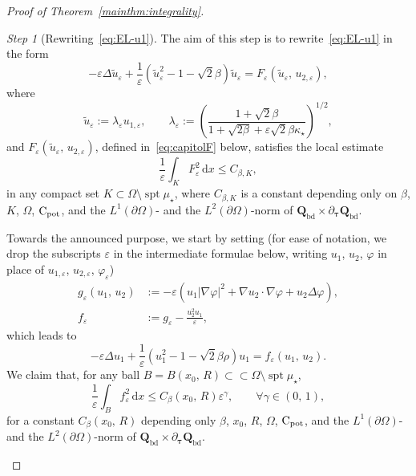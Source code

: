 \documentclass[a4paper, 11pt, twoside, leqno]{article}
\theoremstyle{definition}              %
\theoremstyle{remark}                  %
\newtheorem{step}{Step}
\DeclareMathOperator{\spt}{spt}                                     %
\newcommand{\abs}[1]{\left| #1 \right|}                             %
\newcommand{\csubset}{\subset\!\subset}                             %
\renewcommand{\d}{\mathrm{d}}
\newcommand{\Q}{\mathbf{Q}}
\newcommand{\eps}{\varepsilon}
\newcommand{\Cpot}{{\rm C}_{\rm pot}}
\newcommand{\ttau}{{\boldsymbol{\tau}}}
\newcommand{\Qb}{\Q_{\mathrm{bd}}}
\begin{document}
\begin{proof}[{Proof of Theorem~\ref{mainthm:integrality}}]
    \setcounter{step}{0}
    \begin{step}[Rewriting~\eqref{eq:EL-u1}]
	The aim of this step is to rewrite~\eqref{eq:EL-u1} in the form
    \begin{equation}\label{eq:EL-u1-bis}
    	-\eps \Delta \widetilde{u}_\eps + \frac{1}{\eps}\left( \widetilde{u}_\eps^2 - 1 - \sqrt{2}\beta \right)\widetilde{u}_\eps 
    	= F_\eps\left(\widetilde{u}_\eps,\,u_{2,\eps}\right),
    \end{equation}
    where
    \begin{equation}\label{eq:widetilde-u}
		\widetilde{u}_\eps := \lambda_\eps u_{1,\eps}, \qquad 
		\lambda_\eps := \left(\frac{1 + \sqrt{2}\beta}{1+\sqrt{2\beta} + \eps \sqrt{2}\beta \kappa_\star}\right)^{1/2} ,
    \end{equation}
    and $F_\eps\left( \widetilde{u}_\eps,\,u_{2,\eps} \right)$, 
    defined in~\eqref{eq:capitolF} below, 
    satisfies the local estimate
   	\begin{equation}\label{eq:decay-capitolF}
		\frac{1}{\eps} \int_K F_\eps^2\,{\d}x \leq C_{\beta,K},
   	\end{equation}
   	in any compact set $K \subset \Omega \setminus \spt\mu_\star$, 
   	where $C_{\beta,K}$ is a constant depending only on $\beta$, $K$, 
   	$\Omega$, $\Cpot$, and the $L^1(\partial \Omega)$- and 
   	the $L^2(\partial \Omega)$-norm of $\Qb \times \partial_\ttau \Qb$.
   	
   	\medskip
    \noindent
    Towards the announced purpose, we start by setting (for ease of notation, 
    we drop the subscripts $\eps$ in the intermediate formulae below, writing 
    $u_1$, $u_2$, $\varphi$ in place of $u_{1,\eps}$, $u_{2,\eps}$, $\varphi_\eps$)
    \begin{align*}
        g_\eps(u_1,\,u_2) &:= -\eps\left(u_1 \abs{\nabla \varphi}^2 + \nabla u_2 \cdot \nabla \varphi + u_2 \Delta \varphi\right), 
        \\
        f_\eps &:= g_\eps - \frac{u_2^2 u_1}{\eps},
    \end{align*}
    which leads to
   \begin{equation}\label{eq:u1-pert}
        -\eps \Delta u_1 + \frac{1}{\eps}\left(u_1^2 - 1 - \sqrt{2}\beta \rho \right)u_1 = f_\eps(u_1,\,u_2).
    \end{equation}
    We claim that, for any ball $B = B(x_0,\,R) \csubset \Omega \setminus \spt\mu_\star$, 
    \begin{equation}\label{eq:decay-f}
        \frac{1}{\eps}\int_B f_\eps^2\,{\d}x \leq C_\beta(x_0,\,R) \eps^\gamma, 
        \qquad \forall \gamma \in (0,\,1),
    \end{equation}
    for a constant $C_\beta(x_0,\,R)$  
    depending only $\beta$, $x_0$, $R$, $\Omega$, $\Cpot$, 
    and the $L^1(\partial \Omega)$- and the $L^2(\partial \Omega)$-norm 
    of $\Qb \times \partial_\ttau \Qb$.
    

\end{step}
\end{proof}
\end{document}
